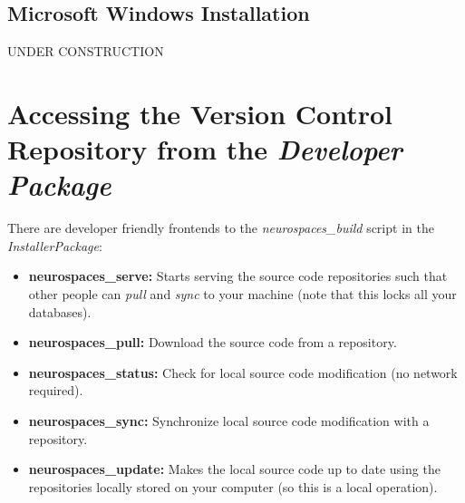 \documentclass[12pt]{article}
\begin{document}
\subsection*{Microsoft Windows Installation}

UNDER CONSTRUCTION

\section*{Accessing the Version Control Repository from the {\it Developer Package}}




There are developer friendly frontends to the {\it neurospaces\_build} script in the {\it InstallerPackage}:
\begin{itemize}
\item {\bf neurospaces\_serve:} Starts serving the source code repositories such that other people can {\it pull} and {\it sync} to your machine (note that this locks all your databases).
\item {\bf neurospaces\_pull:} Download the source code from a repository.
\item {\bf neurospaces\_status:} Check for local source code modification (no network required).
\item {\bf neurospaces\_sync:} Synchronize local source code modification with a repository.
\item {\bf neurospaces\_update:} Makes the local source code up to date using the repositories locally stored on your computer (so this is a local operation). 
\end{itemize}
\end{document}
